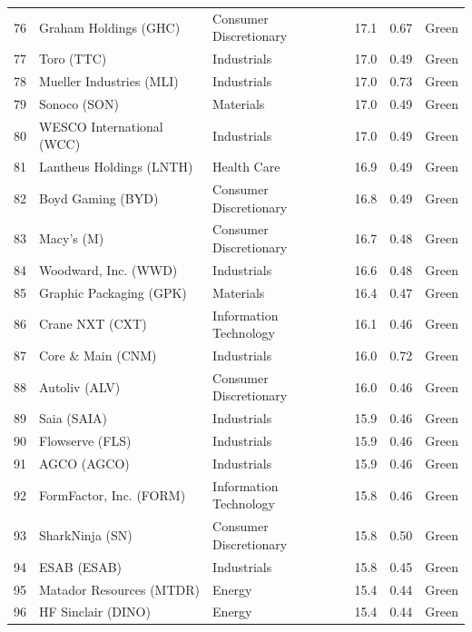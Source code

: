 \documentclass[11pt,a4paper]{article}
\begin{document}
{\begin{longtable}{r p{4.6cm} p{3cm} r r l}
76 & Graham Holdings (GHC) & Consumer Discretionary & 17.1 & 0.67 & \cellcolor[HTML]{C6EFCE}Green \\
77 & Toro (TTC) & Industrials & 17.0 & 0.49 & \cellcolor[HTML]{C6EFCE}Green \\
78 & Mueller Industries (MLI) & Industrials & 17.0 & 0.73 & \cellcolor[HTML]{C6EFCE}Green \\
79 & Sonoco (SON) & Materials & 17.0 & 0.49 & \cellcolor[HTML]{C6EFCE}Green \\
80 & WESCO International (WCC) & Industrials & 17.0 & 0.49 & \cellcolor[HTML]{C6EFCE}Green \\
81 & Lantheus Holdings (LNTH) & Health Care & 16.9 & 0.49 & \cellcolor[HTML]{C6EFCE}Green \\
82 & Boyd Gaming (BYD) & Consumer Discretionary & 16.8 & 0.49 & \cellcolor[HTML]{C6EFCE}Green \\
83 & Macy's (M) & Consumer Discretionary & 16.7 & 0.48 & \cellcolor[HTML]{C6EFCE}Green \\
84 & Woodward, Inc. (WWD) & Industrials & 16.6 & 0.48 & \cellcolor[HTML]{C6EFCE}Green \\
85 & Graphic Packaging (GPK) & Materials & 16.4 & 0.47 & \cellcolor[HTML]{C6EFCE}Green \\
86 & Crane NXT (CXT) & Information Technology & 16.1 & 0.46 & \cellcolor[HTML]{C6EFCE}Green \\
87 & Core \& Main (CNM) & Industrials & 16.0 & 0.72 & \cellcolor[HTML]{C6EFCE}Green \\
88 & Autoliv (ALV) & Consumer Discretionary & 16.0 & 0.46 & \cellcolor[HTML]{C6EFCE}Green \\
89 & Saia (SAIA) & Industrials & 15.9 & 0.46 & \cellcolor[HTML]{C6EFCE}Green \\
90 & Flowserve (FLS) & Industrials & 15.9 & 0.46 & \cellcolor[HTML]{C6EFCE}Green \\
91 & AGCO (AGCO) & Industrials & 15.9 & 0.46 & \cellcolor[HTML]{C6EFCE}Green \\
92 & FormFactor, Inc. (FORM) & Information Technology & 15.8 & 0.46 & \cellcolor[HTML]{C6EFCE}Green \\
93 & SharkNinja (SN) & Consumer Discretionary & 15.8 & 0.50 & \cellcolor[HTML]{C6EFCE}Green \\
94 & ESAB (ESAB) & Industrials & 15.8 & 0.45 & \cellcolor[HTML]{C6EFCE}Green \\
95 & Matador Resources (MTDR) & Energy & 15.4 & 0.44 & \cellcolor[HTML]{C6EFCE}Green \\
96 & HF Sinclair (DINO) & Energy & 15.4 & 0.44 & \cellcolor[HTML]{C6EFCE}Green \\

\end{longtable}}
\end{document}
